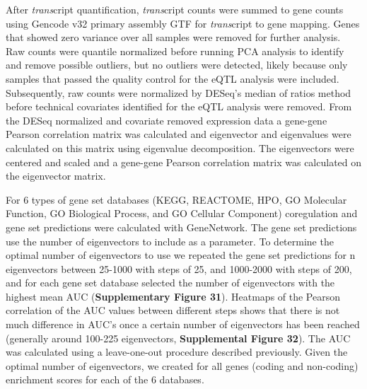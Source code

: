 After \emph{trans}cript quantification, \emph{trans}cript counts were summed to gene counts using Gencode\cite{frankishGENCODEReferenceAnnotation2019} v32 primary assembly GTF for \emph{trans}cript to gene mapping.  Genes that showed zero variance over all samples were removed for further analysis. Raw counts were quantile normalized before running PCA analysis to identify and remove possible outliers, but no outliers were detected, likely because only samples that passed the quality control for the eQTL analysis were included. Subsequently, raw counts were normalized by DESeq’s\cite{loveModeratedEstimationFold2014} median of ratios method before technical covariates identified for the eQTL analysis were removed. From the DESeq\cite{loveModeratedEstimationFold2014} normalized and covariate removed expression data a gene-gene Pearson correlation matrix was calculated and eigenvector and eigenvalues were calculated on this matrix using eigenvalue decomposition. The eigenvectors were centered and scaled and a gene-gene Pearson correlation matrix was calculated on the eigenvector matrix. 

For 6 types of gene set databases (KEGG, REACTOME, HPO, GO Molecular Function, GO Biological Process, and GO Cellular Component) coregulation and gene set predictions were calculated with GeneNetwork. The gene set predictions use the number of eigenvectors to include as a parameter. To determine the optimal number of eigenvectors to use we repeated the gene set predictions for n eigenvectors between 25-1000 with steps of 25, and 1000-2000 with steps of 200, and for each gene set database selected the number of eigenvectors with the highest mean AUC (\textbf{Supplementary Figure 31}). Heatmaps of the Pearson correlation of the AUC values between different steps shows that there is not much difference in AUC’s once a certain number of eigenvectors has been reached (generally around 100-225 eigenvectors, \textbf{Supplemental Figure 32}). The AUC was calculated using a leave-one-out procedure described previously\cite{jassalReactomePathwayKnowledgebase2020}. Given the optimal number of eigenvectors, we created for all genes (coding and non-coding) enrichment scores for each of the 6 databases. 

